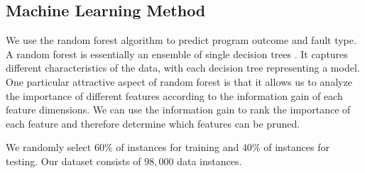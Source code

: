 
\subsection{Machine Learning Method}\label{section:ML}
We use the random forest algorithm to predict program outcome and fault type. A random forest is essentially an ensemble of single decision trees \cite{breiman2001random}. It captures different characteristics of the data, with each decision tree representing a model. One particular attractive aspect of random forest is that it allows us to analyze the importance of different features according to the information gain of each feature dimensions. We can use the information gain to rank the importance of each feature and therefore determine which features can be pruned.





We randomly select $60\%$ of instances for training and $40\%$ of instances for testing. Our dataset consists of $98,000$ data instances.
